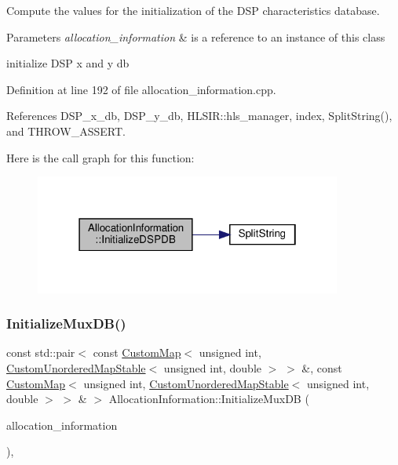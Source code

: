 Compute the values for the initialization of the D\+SP characteristics database. 


\begin{DoxyParams}{Parameters}
{\em allocation\+\_\+information} & is a reference to an instance of this class \\
\hline
\end{DoxyParams}
initialize D\+SP x and y db 

Definition at line 192 of file allocation\+\_\+information.\+cpp.



References D\+S\+P\+\_\+x\+\_\+db, D\+S\+P\+\_\+y\+\_\+db, H\+L\+S\+I\+R\+::hls\+\_\+manager, index, Split\+String(), and T\+H\+R\+O\+W\+\_\+\+A\+S\+S\+E\+RT.

Here is the call graph for this function\+:
\nopagebreak
\begin{figure}[H]
\begin{center}
\leavevmode
\includegraphics[width=286pt]{d7/d79/classAllocationInformation_a5eef44ab205d172b0d5e47a5d55acbd7_cgraph}
\end{center}
\end{figure}
\mbox{\label{classAllocationInformation_ad396c6ab4099e242cdf8411c932fd859}} 
\subsubsection{\texorpdfstring{Initialize\+Mux\+D\+B()}{InitializeMuxDB()}}
{\footnotesize\ttfamily const std\+::pair$<$ const \hyperlink{custom__map_8hpp_a18ca01763abbe3e5623223bfe5aaac6b}{Custom\+Map}$<$ unsigned int, \hyperlink{custom__map_8hpp_a7314a7df1cdb3a3acf478ab86e95c226}{Custom\+Unordered\+Map\+Stable}$<$ unsigned int, double $>$ $>$ \&, const \hyperlink{custom__map_8hpp_a18ca01763abbe3e5623223bfe5aaac6b}{Custom\+Map}$<$ unsigned int, \hyperlink{custom__map_8hpp_a7314a7df1cdb3a3acf478ab86e95c226}{Custom\+Unordered\+Map\+Stable}$<$ unsigned int, double $>$ $>$ \& $>$ Allocation\+Information\+::\+Initialize\+Mux\+DB (\begin{DoxyParamCaption}\item[{const \hyperlink{allocation__information_8hpp_a54287618a63bf87e31ddb17ba01e7ca7}{Allocation\+Information\+Const\+Ref}}]{allocation\+\_\+information }\end{DoxyParamCaption})\hspace{0.3cm}{\ttfamily [static]}, {\ttfamily [private]}}



